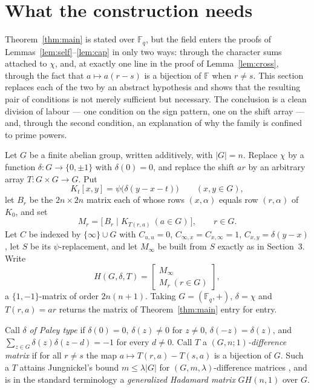 \documentclass[11pt]{article}
\newcommand{\F}{\mathbb F}
\begin{document}
\section{What the construction needs}\label{sec:char}

Theorem~\ref{thm:main} is stated over \(\F_q\), but the field enters the
proofs of Lemmas~\ref{lem:self}--\ref{lem:cap} in only two ways: through the
character sums attached to \(\chi\), and, at exactly one line in the proof of
Lemma~\ref{lem:cross}, through the fact that \(a\mapsto a(r-s)\) is a
bijection of \(\F\) when \(r\neq s\).  This section replaces each of the two
by an abstract hypothesis and shows that the resulting pair of conditions is
not merely sufficient but necessary.  The conclusion is a clean division of
labour --- one condition on the sign pattern, one on the shift array --- and,
through the second condition, an explanation of why the family is confined to
prime powers.

Let \(G\) be a finite abelian group, written additively, with \(|G|=n\).
Replace \(\chi\) by a function \(\delta\colon G\to\{0,\pm1\}\) with
\(\delta(0)=0\), and replace the shift \(ar\) by an arbitrary array
\(T\colon G\times G\to G\).  Put
\[
        K_t[x,y]=\psi\bigl(\delta(y-x-t)\bigr)\qquad(x,y\in G),
\]
let \(B_r\) be the \(2n\times2n\) matrix each of whose rows \((x,\alpha)\)
equals row \((r,\alpha)\) of \(K_0\), and set
\[
        M_r=\bigl[\,B_r\mid K_{T(r,a)}\ (a\in G)\,\bigr],\qquad r\in G .
\]
Let \(C\) be indexed by \(\{\infty\}\cup G\) with \(C_{u,u}=0\),
\(C_{\infty,x}=C_{x,\infty}=1\), \(C_{x,y}=\delta(y-x)\), let \(S\) be its
\(\psi\)-replacement, and let \(M_\infty\) be built from \(S\) exactly as in
Section~3.  Write
\[
        H(G,\delta,T)=\begin{bmatrix}M_\infty\\ M_r\ (r\in G)\end{bmatrix},
\]
a \(\{1,-1\}\)-matrix of order \(2n(n+1)\).  Taking \(G=(\F_q,+)\),
\(\delta=\chi\) and \(T(r,a)=ar\) returns the matrix of
Theorem~\ref{thm:main} entry for entry.

Call \(\delta\) \emph{of Paley type} if \(\delta(0)=0\),
\(\delta(z)\neq0\) for \(z\neq0\), \(\delta(-z)=\delta(z)\), and
\(\sum_{z\in G}\delta(z)\delta(z-d)=-1\) for every \(d\neq0\).  Call \(T\) a \emph{\((G,n;1)\)-difference matrix} if for
all \(r\neq s\) the map \(a\mapsto T(r,a)-T(s,a)\) is a bijection of \(G\).
Such a \(T\) attains Jungnickel's bound \(m\le\lambda|G|\) for
\((G,m,\lambda)\)-difference matrices \cite[Thm.~2.2]{Jungnickel1979}, and
is in the standard terminology a \emph{generalized Hadamard matrix}
\(GH(n,1)\) over \(G\).
\end{document}
